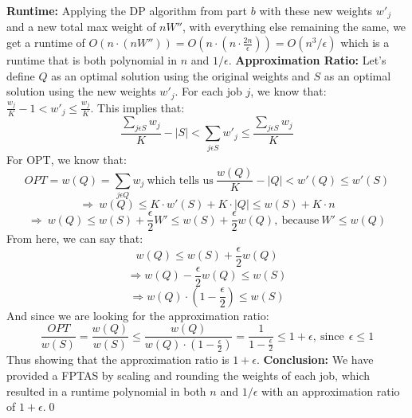 \documentclass[oneside]{homework} %
\begin{document}
\textbf{Runtime:} 
\newline
Applying the DP algorithm from part $b$ with these new weights $w'_j$ and a new total max weight of $nW''$, with everything else remaining the same, we get a runtime of $O(n\cdot(nW'')) = O(n\cdot(n\cdot\frac{2n}{\epsilon})) = O(n^3/\epsilon)$ which is a runtime that is both polynomial in $n$ and $1/\epsilon$.
\newline
\newline
\textbf{Approximation Ratio:} 
\newline
Let's define $Q$ as an optimal solution using the original weights and $S$ as an optimal solution using the new weights $w'_j$.
\newline
For each job $j$, we know that: $\frac{w_j}{K} - 1 < w'_j \leq \frac{w_j}{K}$. This implies that: 
$$\frac{\sum\limits_{j\epsilon S}w_j}{K} - |S| < \sum\limits_{j\epsilon S}w'_j \leq \frac{\sum\limits_{j\epsilon S}w_j}{K}$$
For OPT, we know that: 
$$OPT = w(Q) = \sum\limits_{j\epsilon Q}w_j \ \text{which tells us} \ \frac{w(Q)}{K} - |Q| < w'(Q) \leq w'(S)$$ 
$$\Longrightarrow \ w(Q) \leq K \cdot w'(S) + K \cdot |Q| \leq w(S) + K \cdot n$$
$$\Longrightarrow \ w(Q) \leq w(S) + \frac{\epsilon}{2}W' \leq w(S) + \frac{\epsilon}{2}w(Q), \ \text{because} \ W' \leq w(Q)$$
From here, we can say that:
$$w(Q) \leq w(S) + \frac{\epsilon}{2}w(Q)$$
$$\Longrightarrow w(Q) - \frac{\epsilon}{2}w(Q) \leq w(S)$$
$$\Longrightarrow w(Q) \cdot (1 - \frac{\epsilon}{2}) \leq w(S)$$
And since we are looking for the approximation ratio:
$$\frac{OPT}{w(S)} = \frac{w(Q)}{w(S)} \leq \frac{w(Q)}{w(Q) \cdot (1 - \frac{\epsilon}{2})} = \frac{1}{1 - \frac{\epsilon}{2}} \leq 1 + \epsilon, \ \text{since} \ \ \epsilon \leq 1$$
Thus showing that the approximation ratio is $1 + \epsilon$.
\newline
\newline
\textbf{Conclusion:} We have provided a FPTAS by scaling and rounding the weights of each job, which resulted in a runtime polynomial in both $n$ and $1/\epsilon$ with an approximation ratio of $1 + \epsilon$.\hfill\qed
\end{document}
